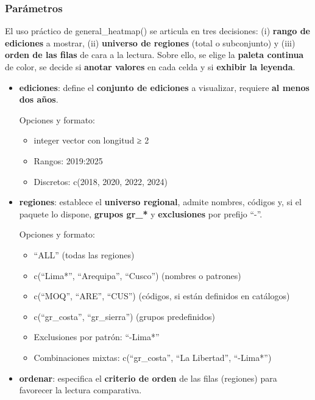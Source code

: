 \documentclass[
  11pt,
  letterpaper,
  DIV=11,
  numbers=noendperiod]{scrartcl}
\begin{document}
\subsubsection{\texorpdfstring{\textbf{Parámetros}}{Parámetros}}\label{paruxe1metros-4}

El uso práctico de general\_heatmap() se articula en tres decisiones:
(i) \textbf{rango de ediciones} a mostrar, (ii) \textbf{universo de
regiones} (total o subconjunto) y (iii) \textbf{orden de las filas} de
cara a la lectura. Sobre ello, se elige la \textbf{paleta continua} de
color, se decide si \textbf{anotar valores} en cada celda y si
\textbf{exhibir la leyenda}.

\begin{itemize}
\item
  \textbf{ediciones}: define el \textbf{conjunto de ediciones} a
  visualizar, requiere \textbf{al menos dos años}.

  Opciones y formato:

  \begin{itemize}
  \item
    integer vector con longitud ≥ 2
  \item
    Rangos: 2019:2025
  \item
    Discretos: c(2018, 2020, 2022, 2024)
  \end{itemize}
\item
  \textbf{regiones}: establece el \textbf{universo regional}, admite
  nombres, códigos y, si el paquete lo dispone, \textbf{grupos gr\_*} y
  \textbf{exclusiones} por prefijo ``-''.

  Opciones y formato:

  \begin{itemize}
  \item
    ``ALL'' (todas las regiones)
  \item
    c(``Lima*'', ``Arequipa'', ``Cusco'') (nombres o patrones)
  \item
    c(``MOQ'', ``ARE'', ``CUS'') (códigos, si están definidos en
    catálogos)
  \item
    c(``gr\_costa'', ``gr\_sierra'') (grupos predefinidos)
  \item
    Exclusiones por patrón: ``-Lima*''
  \item
    Combinaciones mixtas: c(``gr\_costa'', ``La Libertad'', ``-Lima*'')
  \end{itemize}
\item
  \textbf{ordenar}: especifica el \textbf{criterio de orden} de las
  filas (regiones) para favorecer la lectura comparativa.


\end{itemize}
\end{document}
